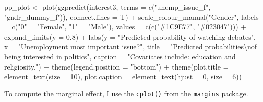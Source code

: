 \documentclass[
]{article}
\newenvironment{Shaded}{\begin{snugshade}}{\end{snugshade}}
\newcommand{\AttributeTok}[1]{\textcolor[rgb]{0.77,0.63,0.00}{#1}}
\newcommand{\DecValTok}[1]{\textcolor[rgb]{0.00,0.00,0.81}{#1}}
\newcommand{\FloatTok}[1]{\textcolor[rgb]{0.00,0.00,0.81}{#1}}
\newcommand{\FunctionTok}[1]{\textcolor[rgb]{0.00,0.00,0.00}{#1}}
\newcommand{\NormalTok}[1]{#1}
\newcommand{\OtherTok}[1]{\textcolor[rgb]{0.56,0.35,0.01}{#1}}
\newcommand{\SpecialCharTok}[1]{\textcolor[rgb]{0.00,0.00,0.00}{#1}}
\newcommand{\StringTok}[1]{\textcolor[rgb]{0.31,0.60,0.02}{#1}}
\begin{document}
\begin{Shaded}
\begin{Highlighting}[]
\NormalTok{pp\_plot }\OtherTok{\textless{}{-}} \FunctionTok{plot}\NormalTok{(}\FunctionTok{ggpredict}\NormalTok{(interest3, }\AttributeTok{terms =} \FunctionTok{c}\NormalTok{(}\StringTok{"unemp\_issue\_f"}\NormalTok{, }\StringTok{"gndr\_dummy\_f"}\NormalTok{)), }
     \AttributeTok{connect.lines =}\NormalTok{ T) }\SpecialCharTok{+}
  \FunctionTok{scale\_colour\_manual}\NormalTok{(}\StringTok{"Gender"}\NormalTok{,}
                      \AttributeTok{labels =} \FunctionTok{c}\NormalTok{(}\StringTok{"0"} \OtherTok{=} \StringTok{"Female"}\NormalTok{,}
                                 \StringTok{"1"} \OtherTok{=} \StringTok{"Male"}\NormalTok{),}
                      \AttributeTok{values =} \FunctionTok{c}\NormalTok{(}\FunctionTok{c}\NormalTok{(}\StringTok{"\#1C9E77"}\NormalTok{, }\StringTok{"\#023047"}\NormalTok{))) }\SpecialCharTok{+}
  \FunctionTok{expand\_limits}\NormalTok{(}\AttributeTok{y =} \FloatTok{0.8}\NormalTok{) }\SpecialCharTok{+}
  \FunctionTok{labs}\NormalTok{(}\AttributeTok{y =} \StringTok{"Predicted probability of watching debates"}\NormalTok{,}
       \AttributeTok{x =} \StringTok{"Unemployment most important issue?"}\NormalTok{,}
       \AttributeTok{title =} \StringTok{"Predicted probabilities}\SpecialCharTok{\textbackslash{}n}\StringTok{of being interested in politics"}\NormalTok{, }
       \AttributeTok{caption =} \StringTok{"Covariates include: education and religiosity."}\NormalTok{) }\SpecialCharTok{+}
  \FunctionTok{theme}\NormalTok{(}\AttributeTok{legend.position =} \StringTok{"bottom"}\NormalTok{) }\SpecialCharTok{+}
  \FunctionTok{theme}\NormalTok{(}\AttributeTok{plot.title =} \FunctionTok{element\_text}\NormalTok{(}\AttributeTok{size =} \DecValTok{10}\NormalTok{),}
        \AttributeTok{plot.caption =} \FunctionTok{element\_text}\NormalTok{(}\AttributeTok{hjust =} \DecValTok{0}\NormalTok{, }\AttributeTok{size =} \DecValTok{6}\NormalTok{))}
\end{Highlighting}
\end{Shaded}

To compute the marginal effect, I use the \texttt{cplot()} from the
\texttt{margins} package.
\end{document}
